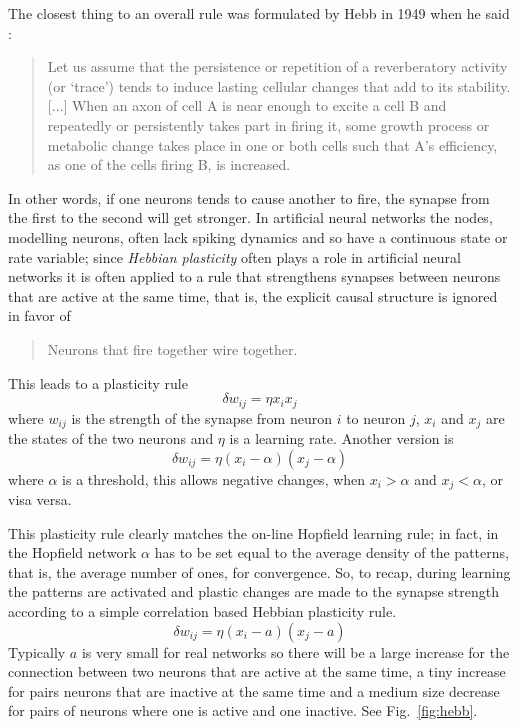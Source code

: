 \documentclass[12pt]{article}
\begin{document}
The closest thing to an overall rule was formulated by Hebb in 1949
when he said \cite{Hebb1949a}:
\begin{quote}
Let us assume that the persistence or repetition of a reverberatory
activity (or \lq{}trace\rq{}) tends to induce lasting cellular changes that
add to its stability. [$\ldots$] When an axon of cell A is near enough to excite
a cell B and repeatedly or persistently takes part in firing it, some
growth process or metabolic change takes place in one or both cells
such that A's efficiency, as one of the cells firing B, is increased.
\end{quote}
In other words, if one neurons tends to cause another to fire, the
synapse from the first to the second will get stronger. In artificial
neural networks the nodes, modelling neurons, often lack spiking
dynamics and so have a continuous state or rate variable; since
\textsl{Hebbian plasticity} often plays a role in artificial neural
networks it is often applied to a rule that strengthens synapses
between neurons that are active at the same time, that is, the
explicit causal structure is ignored in favor of
\begin{quote}
Neurons that fire together wire together.
\end{quote}
This leads to a plasticity rule 
\begin{equation}
\delta w_{ij}=\eta x_i x_j
\end{equation}
where $w_{ij}$ is the strength of the synapse from neuron $i$ to
neuron $j$, $x_i$ and $x_j$ are the states of the two neurons and
$\eta$ is a learning rate. Another version is
\begin{equation}
\delta w_{ij}=\eta (x_i-\alpha)(x_j-\alpha)
\end{equation}
where $\alpha$ is a threshold, this allows negative changes, when
$x_i>\alpha$ and $x_j<\alpha$, or visa versa.

This plasticity rule clearly matches the on-line Hopfield learning
rule; in fact, in the Hopfield network $\alpha$ has to be set equal to
the average density of the patterns, that is, the average number of
ones, for convergence. So, to recap, during learning the patterns are
activated and plastic changes are made to the synapse strength
according to a simple correlation based Hebbian plasticity rule.
\begin{equation}
\delta w_{ij}=\eta (x_i-a)(x_j-a)
\end{equation}
Typically $a$ is very small for real networks so there will be a large
increase for the connection between two neurons that are active at the
same time, a tiny increase for pairs neurons that are inactive at the
same time and a medium size decrease for pairs of neurons where one is
active and one inactive. See Fig.~\ref{fig:hebb}.
\end{document}
